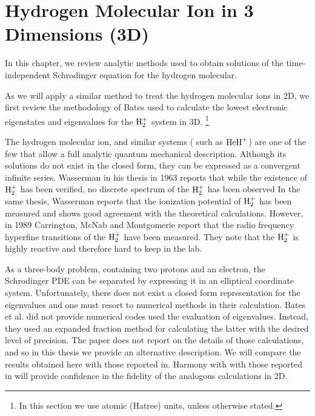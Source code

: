 \chapter{Hydrogen Molecular Ion in 3 Dimensions (3D) }

In this chapter, we review analytic methods\cite{Bates1}\cite{Bates2}\cite{Slater} used to obtain 
solutions of the time-independent Schrodinger equation for 
the hydrogen molecular.

As we will apply a similar method to treat the hydrogen molecular ions in 2D,
we first review the methodology of Bates \cite{Bates1}\cite{Bates2} used to calculate the lowest electronic eigenstates and eigenvalues for the $ {\rm H}_2^{+} $ system in 3D. \footnote {In this section we
use atomic (Hatree) units, unless otherwise stated.}

The hydrogen molecular ion, and similar systems ( such as $ {\rm HeH}^{+} $) are one of the few that allow a full analytic quantum mechanical description. Although its
solutions do not exist in the closed form, they can be expressed as a convergent infinite series.  Wasserman in his thesis \cite{ExperimentalBates2} in 1963 reports that while the existence of $ {\rm H}_2^{+} $ has been verified, no  discrete spectrum of the  $ {\rm H}_2^{+} $ has been observed  In the same thesis, Wasserman reports that the ionization potential of $ {\rm H}_2^{+} $ has been measured and shows good agreement with the theoretical calculations. However, in 1989 Carrington, McNab and Montgomerie report \cite{ExperimentalBates3} that the radio frequency hyperfine transitions of the $ {\rm H}_2^{+} $ have been measured. They note that the $ {\rm H}_2^{+} $  is highly reactive and therefore hard to keep in the lab.

As a three-body problem, containing two protons and an electron,
the Schrodinger PDE can be separated by expressing it in an elliptical coordinate system. Unfortunately, there does not exist a closed form representation for the eigenvalues and one must resort to numerical methods in their calculation.
Bates et al. \cite{Bates1}\cite{Bates2} did not provide numerical codes used the evaluation of eigenvalues. Instead, they used an expanded fraction method for calculating the latter with the desired level of precision. The paper\cite{Bates2} does not report on the details of those calculations, and so in this thesis we provide an alternative description. We will compare
 the results obtained here with those reported in\cite{Bates2}. Harmony with with those reported in\cite{Bates2} will provide 
 confidence in the fidelity of the analogous calculations in 2D.

